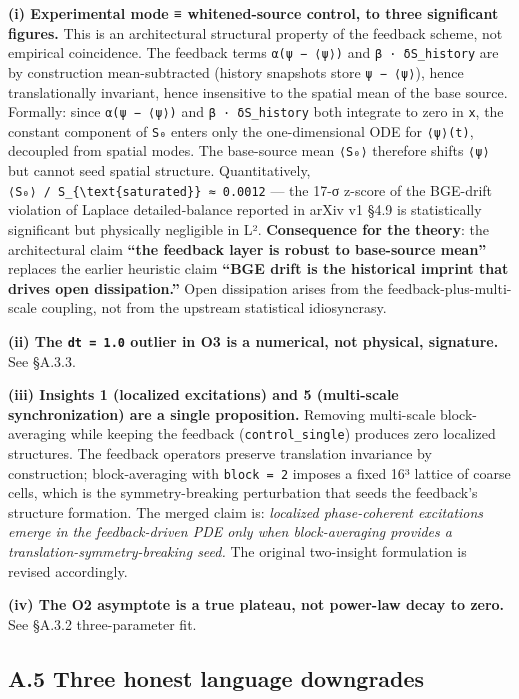 \documentclass[
]{article}
\begin{document}
\textbf{(i) Experimental mode ≡ whitened-source control, to three
significant figures.} This is an architectural structural property of
the feedback scheme, not empirical coincidence. The feedback terms
\texttt{α(ψ\ −\ ⟨ψ⟩)} and \texttt{β\ ·\ δS\_history} are by construction
mean-subtracted (history snapshots store \texttt{ψ\ −\ ⟨ψ⟩}), hence
translationally invariant, hence insensitive to the spatial mean of the
base source. Formally: since \texttt{α(ψ\ −\ ⟨ψ⟩)} and
\texttt{β\ ·\ δS\_history} both integrate to zero in \texttt{x}, the
constant component of \texttt{S₀} enters only the one-dimensional ODE
for \texttt{⟨ψ⟩(t)}, decoupled from spatial modes. The base-source mean
\texttt{⟨S₀⟩} therefore shifts \texttt{⟨ψ⟩} but cannot seed spatial
structure. Quantitatively,
\texttt{\textbar{}⟨S₀⟩\textbar{}\ /\ \textbar{}S\_\{\textbackslash{}text\{saturated\}\}\textbar{}\ ≈\ 0.0012}
--- the 17-σ z-score of the BGE-drift violation of Laplace
detailed-balance reported in arXiv v1 §4.9 is statistically significant
but physically negligible in L². \textbf{Consequence for the theory}:
the architectural claim \textbf{``the feedback layer is robust to
base-source mean''} replaces the earlier heuristic claim \textbf{``BGE
drift is the historical imprint that drives open dissipation.''} Open
dissipation arises from the feedback-plus-multi-scale coupling, not from
the upstream statistical idiosyncrasy.

\textbf{(ii) The \texttt{dt\ =\ 1.0} outlier in O3 is a numerical, not
physical, signature.} See §A.3.3.

\textbf{(iii) Insights 1 (localized excitations) and 5 (multi-scale
synchronization) are a single proposition.} Removing multi-scale
block-averaging while keeping the feedback (\texttt{control\_single})
produces zero localized structures. The feedback operators preserve
translation invariance by construction; block-averaging with
\texttt{block\ =\ 2} imposes a fixed 16³ lattice of coarse cells, which
is the symmetry-breaking perturbation that seeds the feedback's
structure formation. The merged claim is: \emph{localized phase-coherent
excitations emerge in the feedback-driven PDE only when block-averaging
provides a translation-symmetry-breaking seed.} The original two-insight
formulation is revised accordingly.

\textbf{(iv) The O2 asymptote is a true plateau, not power-law decay to
zero.} See §A.3.2 three-parameter fit.

\hypertarget{a.5-three-honest-language-downgrades}{%
\subsection{A.5 Three honest language
downgrades}\label{a.5-three-honest-language-downgrades}}
\end{document}
